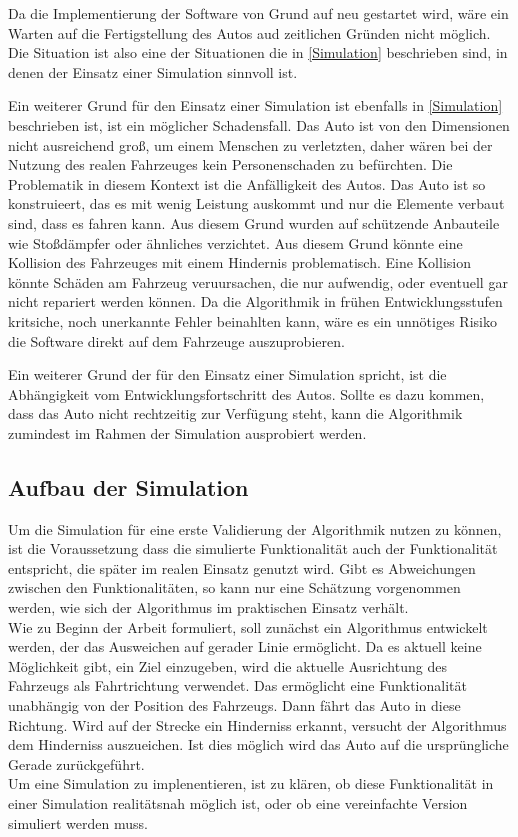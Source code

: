 Da die Implementierung der Software von Grund auf neu gestartet wird, 
wäre ein Warten auf die Fertigstellung des Autos aud zeitlichen Gründen nicht möglich.
Die Situation ist also eine der Situationen die in \ref{Simulation} beschrieben sind, 
in denen der Einsatz einer Simulation sinnvoll ist.

Ein weiterer Grund für den Einsatz einer Simulation ist ebenfalls in \ref{Simulation} beschrieben ist, 
ist ein möglicher Schadensfall. Das Auto ist von den Dimensionen nicht ausreichend groß, 
um einem Menschen zu verletzten, daher wären bei der Nutzung des realen Fahrzeuges kein Personenschaden zu befürchten.
Die Problematik in diesem Kontext ist die Anfälligkeit des Autos. 
Das Auto ist so konstruieert, das es mit wenig Leistung auskommt und nur die Elemente verbaut sind, 
dass es fahren kann. Aus diesem Grund wurden auf schützende Anbauteile wie Stoßdämpfer oder ähnliches verzichtet.
Aus diesem Grund könnte eine Kollision des Fahrzeuges mit einem Hindernis problematisch. 
Eine Kollision könnte Schäden am Fahrzeug veruursachen, die nur aufwendig, oder eventuell gar nicht repariert werden können.
Da die Algorithmik in frühen Entwicklungsstufen kritsiche, noch unerkannte Fehler beinahlten kann,
wäre es ein unnötiges Risiko die Software direkt auf dem Fahrzeuge auszuprobieren.

Ein weiterer Grund der für den Einsatz einer Simulation spricht, ist die Abhängigkeit vom Entwicklungsfortschritt 
des Autos. Sollte es dazu kommen, dass das Auto nicht rechtzeitig zur Verfügung steht, 
kann die Algorithmik zumindest im Rahmen der Simulation ausprobiert werden.

\subsection{Aufbau der Simulation}
Um die Simulation für eine erste Validierung der Algorithmik nutzen zu können, ist die Voraussetzung dass die simulierte Funktionalität auch der Funktionalität entspricht, die später im realen Einsatz genutzt wird.
Gibt es Abweichungen zwischen den Funktionalitäten, so kann nur eine Schätzung vorgenommen werden, wie sich der Algorithmus im praktischen Einsatz verhält. \\
Wie zu Beginn der Arbeit formuliert, soll zunächst ein Algorithmus entwickelt werden, der das Ausweichen auf gerader Linie ermöglicht. 
Da es aktuell keine Möglichkeit gibt, ein Ziel einzugeben, wird die aktuelle Ausrichtung des Fahrzeugs als Fahrtrichtung verwendet. Das ermöglicht eine Funktionalität unabhängig von der Position des Fahrzeugs. 
Dann fährt das Auto in diese Richtung. Wird auf der Strecke ein Hinderniss erkannt, versucht der Algorithmus dem Hinderniss auszueichen. Ist dies möglich wird das Auto auf die ursprüngliche Gerade zurückgeführt. \\
Um eine Simulation zu implenentieren, ist zu klären, ob diese Funktionalität in einer Simulation realitätsnah möglich ist, oder ob eine vereinfachte Version simuliert werden muss.\\

